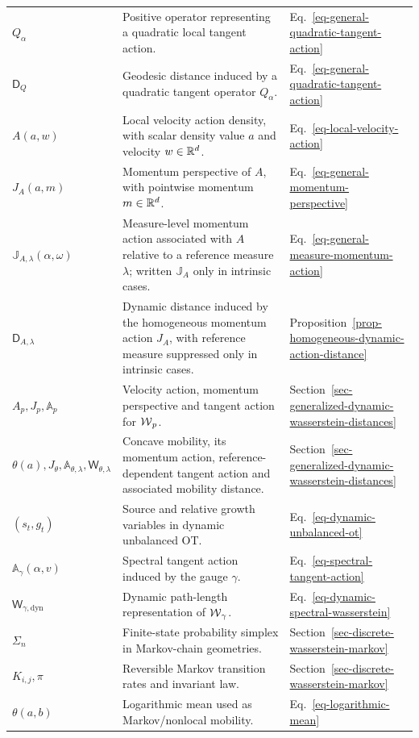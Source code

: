 {\begin{longtable}{>{\raggedright\arraybackslash}p{}
                  >{\raggedright\arraybackslash}p{}
                  >{\raggedright\arraybackslash}p{}}
$Q_\alpha$ & Positive operator representing a quadratic local tangent action. & Eq.~\eqref{eq-general-quadratic-tangent-action} \\
$\mathsf D_Q$ & Geodesic distance induced by a quadratic tangent operator $Q_\alpha$. & Eq.~\eqref{eq-general-quadratic-tangent-action} \\
$A(a,w)$ & Local velocity action density, with scalar density value \(a\) and velocity \(w\in\mathbb{R}^d\). & Eq.~\eqref{eq-local-velocity-action} \\
$J_A(a,m)$ & Momentum perspective of \(A\), with pointwise momentum \(m\in\mathbb{R}^d\). & Eq.~\eqref{eq-general-momentum-perspective} \\
$\mathbb J_{A,\lambda}(\alpha,\omega)$ & Measure-level momentum action associated with \(A\) relative to a reference measure \(\lambda\); written \(\mathbb J_A\) only in intrinsic cases. & Eq.~\eqref{eq-general-measure-momentum-action} \\
$\mathsf D_{A,\lambda}$ & Dynamic distance induced by the homogeneous momentum action \(J_A\), with reference measure suppressed only in intrinsic cases. & Proposition~\ref{prop-homogeneous-dynamic-action-distance} \\
$A_p,J_p,\mathbb A_p$ & Velocity action, momentum perspective and tangent action for $\operatorname{\mathcal{W}}_p$. & Section~\ref{sec-generalized-dynamic-wasserstein-distances} \\
$\theta(a),J_\theta,\mathbb A_{\theta,\lambda},\mathsf W_{\theta,\lambda}$ & Concave mobility, its momentum action, reference-dependent tangent action and associated mobility distance. & Section~\ref{sec-generalized-dynamic-wasserstein-distances} \\
$(s_t,g_t)$ & Source and relative growth variables in dynamic unbalanced OT\@. & Eq.~\eqref{eq-dynamic-unbalanced-ot} \\
$\mathbb A_\gamma(\alpha,v)$ & Spectral tangent action induced by the gauge $\gamma$. & Eq.~\eqref{eq-spectral-tangent-action} \\
$\mathsf W_{\gamma,\mathrm{dyn}}$ & Dynamic path-length representation of $\operatorname{\mathcal{W}}_\gamma$. & Eq.~\eqref{eq-dynamic-spectral-wasserstein} \\
$\Sigma_n$ & Finite-state probability simplex in Markov-chain geometries. & Section~\ref{sec-discrete-wasserstein-markov} \\
$K_{i,j},\pi$ & Reversible Markov transition rates and invariant law. & Section~\ref{sec-discrete-wasserstein-markov} \\
$\theta(a,b)$ & Logarithmic mean used as Markov/nonlocal mobility. & Eq.~\eqref{eq-logarithmic-mean} \\

\end{longtable}}
